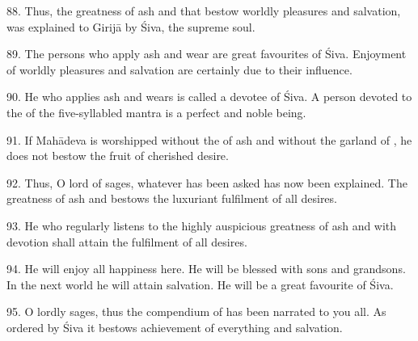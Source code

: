 88. Thus, the greatness of ash and  that bestow worldly pleasures
and salvation, was explained to Girijā by Śiva, the supreme soul.

89. The persons who apply ash and wear  are great favourites of
Śiva. Enjoyment of worldly pleasures and salvation are certainly due to their
influence.

90. He who applies ash and wears  is called a devotee of Śiva.
A person devoted to the  of the five-syllabled mantra is a perfect and
noble being.

91. If Mahādeva is worshipped without the  of ash and without
the garland of , he does not bestow the fruit of cherished desire.

92. Thus, O lord of sages, whatever has been asked has now been explained.
The greatness of ash and  bestows the luxuriant fulfilment of
all desires.

93. He who regularly listens to the highly auspicious greatness of ash and
 with devotion shall attain the fulfilment of all desires.

94. He will enjoy all happiness here. He will be blessed with sons and grandsons.
In the next world he will attain salvation. He will be a great favourite of Śiva.

95. O lordly sages, thus the compendium of  has been
narrated to you all. As ordered by Śiva it bestows achievement of everything
and salvation.

